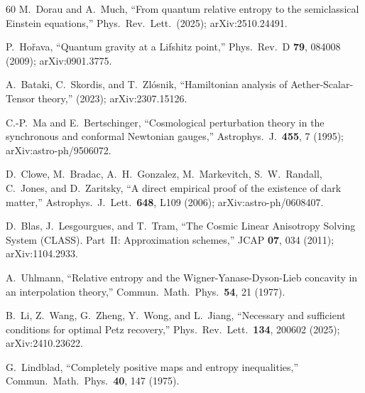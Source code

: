 \documentclass[prd,twocolumn,superscriptaddress,longbibliography,floatfix]{revtex4-2}
\begin{document}
\begin{thebibliography}{60}
M.~Dorau and A.~Much,
``From quantum relative entropy to the semiclassical Einstein
equations,''
Phys.\ Rev.\ Lett.\ (2025); arXiv:2510.24491.

P.~Ho\v{r}ava,
``Quantum gravity at a Lifshitz point,''
Phys.\ Rev.\ D \textbf{79}, 084008 (2009);
arXiv:0901.3775.

A.~Bataki, C.~Skordis, and T.~Zl\'{o}snik,
``Hamiltonian analysis of Aether-Scalar-Tensor theory,''
(2023); arXiv:2307.15126.

C.-P.~Ma and E.~Bertschinger,
``Cosmological perturbation theory in the synchronous and
conformal Newtonian gauges,''
Astrophys.\ J.\ \textbf{455}, 7 (1995);
arXiv:astro-ph/9506072.

D.~Clowe, M.~Bradac, A.~H.~Gonzalez, M.~Markevitch,
S.~W.~Randall, C.~Jones, and D.~Zaritsky,
``A direct empirical proof of the existence of dark matter,''
Astrophys.\ J.\ Lett.\ \textbf{648}, L109 (2006);
arXiv:astro-ph/0608407.

D.~Blas, J.~Lesgourgues, and T.~Tram,
``The Cosmic Linear Anisotropy Solving System (CLASS).
Part~II: Approximation schemes,''
JCAP \textbf{07}, 034 (2011);
arXiv:1104.2933.

A.~Uhlmann,
``Relative entropy and the Wigner-Yanase-Dyson-Lieb concavity in an interpolation theory,''
Commun.\ Math.\ Phys.\ \textbf{54}, 21 (1977).

B.~Li, Z.~Wang, G.~Zheng, Y.~Wong, and L.~Jiang,
``Necessary and sufficient conditions for optimal Petz recovery,''
Phys.\ Rev.\ Lett.\ \textbf{134}, 200602 (2025);
arXiv:2410.23622.

G.~Lindblad,
``Completely positive maps and entropy inequalities,''
Commun.\ Math.\ Phys.\ \textbf{40}, 147 (1975).

\end{thebibliography}
\end{document}
